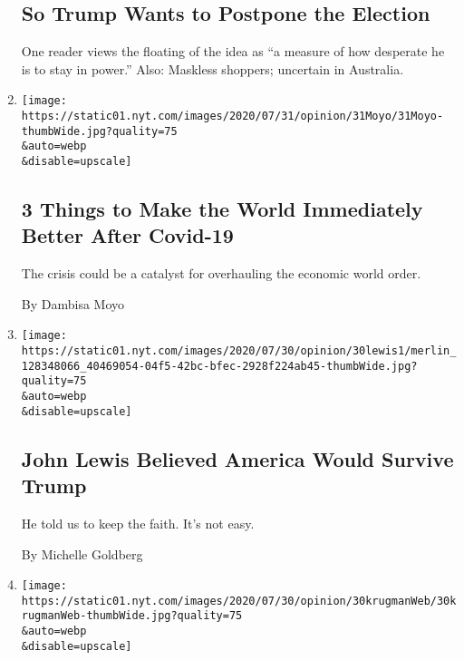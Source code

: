 \begin{enumerate}
  \hypertarget{so-trump-wants-to-postpone-the-election}{%
  \subsection{So Trump Wants to Postpone the
  Election}\label{so-trump-wants-to-postpone-the-election}}

  One reader views the floating of the idea as ``a measure of how
  desperate he is to stay in power.'' Also: Maskless shoppers; uncertain
  in Australia.
\item
  \href{/2020/07/31/opinion/coronavirus-economy.html}{}

  \texttt{[image: https://static01.nyt.com/images/2020/07/31/opinion/31Moyo/31Moyo-thumbWide.jpg?quality=75\\\&auto=webp\\\&disable=upscale]}

  \hypertarget{3-things-to-make-the-world-immediately-better-after-covid-19}{%
  \subsection{3 Things to Make the World Immediately Better After
  Covid-19}\label{3-things-to-make-the-world-immediately-better-after-covid-19}}

  The crisis could be a catalyst for overhauling the economic world
  order.

  By Dambisa Moyo
\item
  \href{/2020/07/30/opinion/john-lewis-legacy.html}{}

  \texttt{[image: https://static01.nyt.com/images/2020/07/30/opinion/30lewis1/merlin\_128348066\_40469054-04f5-42bc-bfec-2928f224ab45-thumbWide.jpg?quality=75\\\&auto=webp\\\&disable=upscale]}

  \hypertarget{john-lewis-believed-america-would-survive-trump}{%
  \subsection{John Lewis Believed America Would Survive
  Trump}\label{john-lewis-believed-america-would-survive-trump}}

  He told us to keep the faith. It's not easy.

  By Michelle Goldberg
\item
  \href{/2020/07/30/opinion/trump-coronavirus-economy.html}{}

  \texttt{[image: https://static01.nyt.com/images/2020/07/30/opinion/30krugmanWeb/30krugmanWeb-thumbWide.jpg?quality=75\\\&auto=webp\\\&disable=upscale]}


\end{enumerate}
